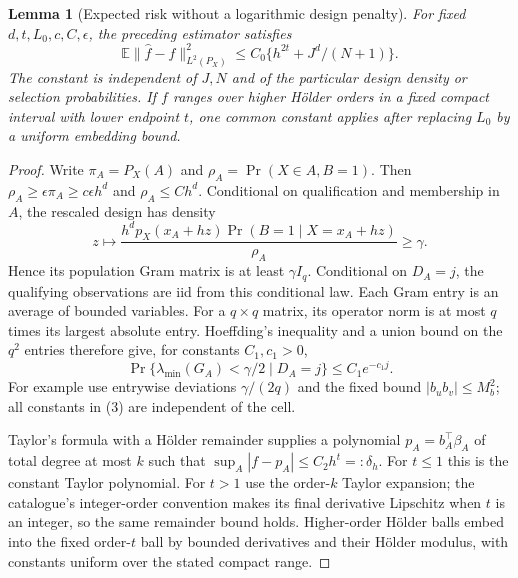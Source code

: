 \documentclass[11pt]{article}
\newtheorem{lemma}[theorem]{Lemma}
\theoremstyle{remark}
\newcommand{\E}{\mathbb E}
\begin{document}
\begin{lemma}[Expected risk without a logarithmic design penalty]
For fixed $d,t,L_0,c,C,\epsilon$, the preceding estimator satisfies
\[
 \E\|\widehat f-f\|_{L^2(P_X)}^2
 \le C_0\{h^{2t}+J^d/(N+1)\}.                       \tag{2}
\]
The constant is independent of $J,N$ and of the particular design density
or selection probabilities. If $f$ ranges over higher H\"older orders in
a fixed compact interval with lower endpoint $t$, one common constant
applies after replacing $L_0$ by a uniform embedding bound.
\end{lemma}
\begin{proof}
Write $\pi_A=P_X(A)$ and
$\rho_A=\Pr(X\in A,B=1)$. Then
$\rho_A\ge\epsilon\pi_A\ge c\epsilon h^d$ and
$\rho_A\le C h^d$. Conditional on qualification and membership in $A$,
the rescaled design has density
\[
 z\longmapsto
 \frac{h^d p_X(x_A+hz)\Pr(B=1\mid X=x_A+hz)}{\rho_A}
 \ge\gamma.
\]
Hence its population Gram matrix is at least $\gamma I_q$.
Conditional on $D_A=j$, the qualifying observations are iid from this
conditional law. Each Gram entry is an average of bounded variables.
For a $q\times q$ matrix, its operator norm is at most $q$ times its
largest absolute entry. Hoeffding's inequality and a union bound on the
$q^2$ entries therefore give, for constants $C_1,c_1>0$,
\[
 \Pr\{\lambda_{\min}(G_A)<\gamma/2\mid D_A=j\}
 \le C_1e^{-c_1j}.                                  \tag{3}
\]
For example use entrywise deviations $\gamma/(2q)$ and the fixed bound
$|b_u b_v|\le M_b^2$; all constants in (3) are independent of the cell.

Taylor's formula with a H\"older remainder supplies a polynomial
$p_A=b_A^\top\beta_A$ of total degree at most $k$ such that
$\sup_A|f-p_A|\le C_2h^t=:\delta_h$.
For $t\le1$ this is the constant Taylor polynomial. For $t>1$ use the
order-$k$ Taylor expansion; the catalogue's integer-order convention
makes its final derivative Lipschitz when $t$ is an integer, so the
same remainder bound holds. Higher-order H\"older balls embed into the
fixed order-$t$ ball by bounded derivatives and their H\"older modulus,
with constants uniform over the stated compact range.


\end{proof}
\end{document}
